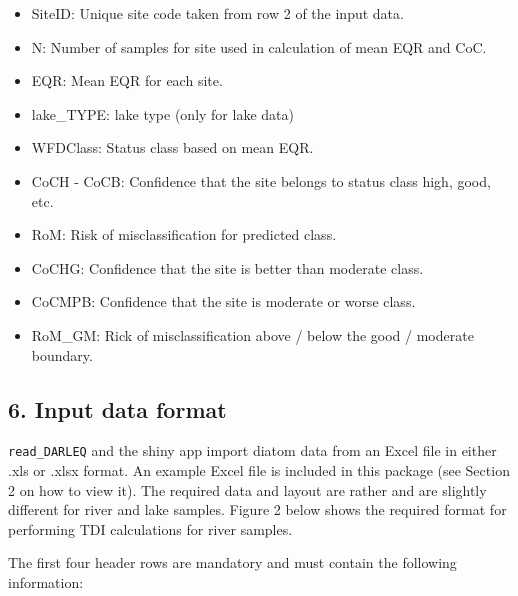 \documentclass[]{article}
\begin{document}
\begin{itemize}
\item
  SiteID: Unique site code taken from row 2 of the input data.
\item
  N: Number of samples for site used in calculation of mean EQR and CoC.
\item
  EQR: Mean EQR for each site.
\item
  lake\_TYPE: lake type (only for lake data)
\item
  WFDClass: Status class based on mean EQR.
\item
  CoCH - CoCB: Confidence that the site belongs to status class high,
  good, etc.
\item
  RoM: Risk of misclassification for predicted class.
\item
  CoCHG: Confidence that the site is better than moderate class.
\item
  CoCMPB: Confidence that the site is moderate or worse class.
\item
  RoM\_GM: Rick of misclassification above / below the good / moderate
  boundary.
\end{itemize}

\subsection{6. Input data format}\label{input-data-format}

\texttt{read\_DARLEQ} and the shiny app import diatom data from an Excel
file in either .xls or .xlsx format. An example Excel file is included
in this package (see Section 2 on how to view it). The required data and
layout are rather and are slightly different for river and lake samples.
Figure 2 below shows the required format for performing TDI calculations
for river samples.

The first four header rows are mandatory and must contain the following
information:
\end{document}
